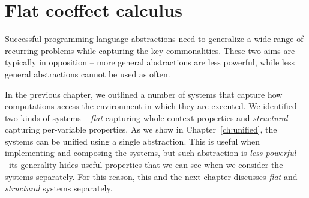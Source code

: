 


\chapter{Flat coeffect calculus} 
\label{ch:flat} 

Successful programming language abstractions need to generalize a wide range of recurring
problems while capturing the key commonalities. These two aims are typically in opposition -- 
more general abstractions are less powerful, while less general abstractions cannot be
used as often.

In the previous chapter, we outlined a number of systems that capture how computations
access the environment in which they are executed. We identified two kinds of systems --
\emph{flat} capturing whole-context properties and \emph{structural} capturing per-variable
properties. As we show in Chapter~\ref{ch:unified}, the systems can be unified using a single 
abstraction. This is useful when implementing and composing the systems, but such abstraction 
is  \emph{less powerful} -- \ie~its generality hides useful properties that we can see 
when we consider the systems separately. For this reason, this and the next chapter discusses 
\emph{flat} and \emph{structural} systems separately.




%                                                                                      
%                                                                                     

